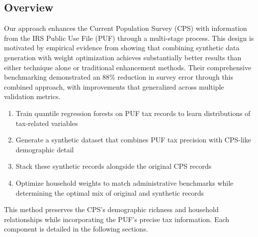 \subsection{Overview}

Our approach enhances the Current Population Survey (CPS) with information from the IRS Public Use File (PUF) through a multi-stage process. This design is motivated by empirical evidence from \citet{woodruff2023survey} showing that combining synthetic data generation with weight optimization achieves substantially better results than either technique alone or traditional enhancement methods. Their comprehensive benchmarking demonstrated an 88\% reduction in survey error through this combined approach, with improvements that generalized across multiple validation metrics.

\begin{enumerate}
    \item Train quantile regression forests on PUF tax records to learn distributions of tax-related variables
    \item Generate a synthetic dataset that combines PUF tax precision with CPS-like demographic detail
    \item Stack these synthetic records alongside the original CPS records
    \item Optimize household weights to match administrative benchmarks while determining the optimal mix of original and synthetic records
\end{enumerate}

This method preserves the CPS's demographic richness and household relationships while incorporating the PUF's precise tax information. Each component is detailed in the following sections.